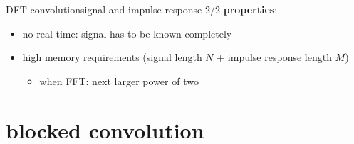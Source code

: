 	\begin{frame}{DFT convolution}{signal and impulse response 2/2}
		\textbf{properties}:
		\begin{itemize}
			\item	no real-time: signal has to be known completely
			\item	high memory requirements (signal length $N$ + impulse response length $M$)
			\begin{itemize}
				\item	when FFT: next larger power of two
			\end{itemize}
		\end{itemize}
	\end{frame}

\section[blocked]{blocked convolution}
